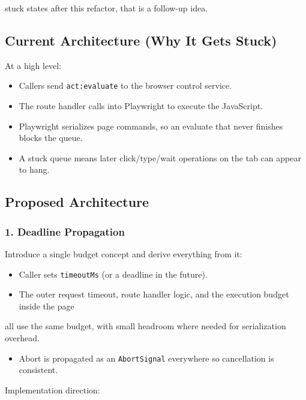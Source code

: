 stuck states after this refactor, that is a follow-up idea.

\subsection{Current Architecture (Why It Gets Stuck)}


At a high level:

\begin{itemize}
  \item Callers send \texttt{act:evaluate} to the browser control service.
  \item The route handler calls into Playwright to execute the JavaScript.
  \item Playwright serializes page commands, so an evaluate that never finishes blocks the queue.
  \item A stuck queue means later click/type/wait operations on the tab can appear to hang.
\end{itemize}


\subsection{Proposed Architecture}


\subsubsection{1. Deadline Propagation}


Introduce a single budget concept and derive everything from it:

\begin{itemize}
  \item Caller sets \texttt{timeoutMs} (or a deadline in the future).
  \item The outer request timeout, route handler logic, and the execution budget inside the page
\end{itemize}

all use the same budget, with small headroom where needed for serialization overhead.
\begin{itemize}
  \item Abort is propagated as an \texttt{AbortSignal} everywhere so cancellation is consistent.
\end{itemize}


Implementation direction:

